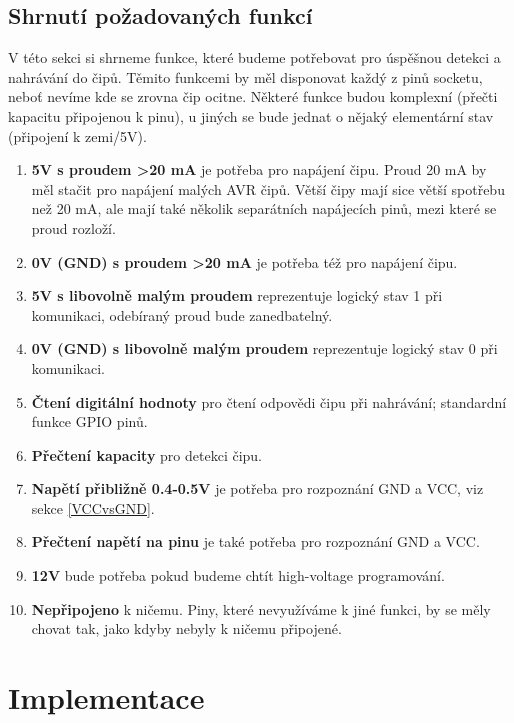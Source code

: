 \documentclass[11pt,a4paper,twoside,openright]{report}
\begin{document}
\section {Shrnutí požadovaných funkcí\label{pinFunc}}

V této sekci si shrneme funkce, které budeme potřebovat pro úspěšnou detekci a nahrávání do čipů. Těmito funkcemi by měl disponovat každý z pinů socketu, neboť nevíme kde se zrovna čip ocitne. Některé funkce budou komplexní (přečti kapacitu připojenou k pinu), u jiných se bude jednat o nějaký elementární stav (připojení k zemi/5V). 

\begin{enumerate}
\item \textbf{5V s proudem >20 mA} je potřeba pro napájení čipu. Proud 20 mA by měl stačit pro napájení malých AVR čipů.\cite{attiny85} Větší čipy mají sice větší spotřebu než 20 mA, ale mají také několik separátních napájecích pinů, mezi které se proud rozloží.\cite{atmega328}
\item \textbf{0V (GND) s proudem >20 mA} je potřeba též pro napájení čipu. 
\item \textbf{5V s libovolně malým proudem} reprezentuje logický stav 1 při komunikaci, odebíraný proud bude zanedbatelný.
\item \textbf{0V (GND) s libovolně malým proudem} reprezentuje logický stav 0 při komunikaci.
\item \textbf{Čtení digitální hodnoty} pro čtení odpovědi čipu při nahrávání; standardní funkce GPIO pinů.
\item \textbf{Přečtení kapacity} pro detekci čipu.
\item \textbf{Napětí přibližně 0.4-0.5V} je potřeba pro rozpoznání GND a VCC, viz sekce \ref{VCCvsGND}.
\item \textbf{Přečtení napětí na pinu} je také potřeba pro rozpoznání GND a VCC.
\item \textbf{12V} bude potřeba pokud budeme chtít high-voltage programování.
\item \textbf{Nepřipojeno} k ničemu. Piny, které nevyužíváme k jiné funkci, by se měly chovat tak, jako kdyby nebyly k ničemu připojené.
\end{enumerate}




\chapter{Implementace}
\end{document}
